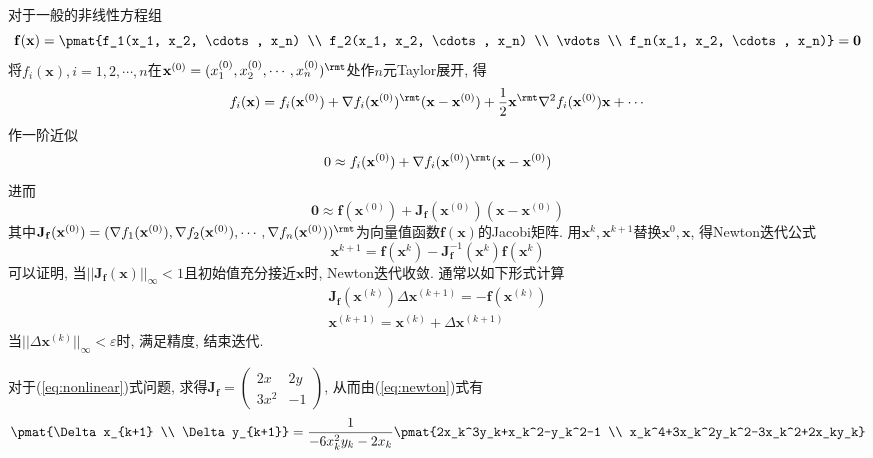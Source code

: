 \documentclass{nedsart}
\begin{document}
\def\bX{\mathbf{x}}
\def\bF{\mathbf{f}}
\def\jacobi{\mathbf{J}_\bF}

对于一般的非线性方程组
\begin{equation}
    \bF(\mathbf{x}) = \pmat{f_1(x_1, x_2, \cdots, x_n) \\ f_2(x_1, x_2, \cdots, x_n) \\ \vdots \\ f_n(x_1, x_2, \cdots, x_n)} = \mathbf{0}
\end{equation}
将$f_i(\bX), i=1,2,\cdots,n$在$\bX^{(0)} = (x^{(0)}_1, x^{(0)}_2, \cdots, x^{(0)}_n)^\rmt$处作$n$元Taylor展开, 得
\begin{equation}
    f_i(\bX) = f_i(\bX^{(0)}) + \nabla f_i(\bX^{(0)})^\rmt (\bX - \bX^{(0)}) + \frac{1}{2} \bX^\rmt \nabla^2 {f_i(\bX^{(0)})} \bX + \cdots
\end{equation}
作一阶近似
\begin{equation}
    0 \approx f_i(\bX^{(0)}) + \nabla f_i(\bX^{(0)})^\rmt (\bX - \bX^{(0)})
\end{equation}
进而
\begin{equation}
    \mathbf{0} \approx \bF(\bX^{(0)}) + \jacobi (\bX^{(0)}) (\bX - \bX^{(0)})
\end{equation}
其中$\jacobi (\bX^{(0)}) = (\nabla f_1(\bX^{(0)}), \nabla f_2(\bX^{(0)}), \cdots, \nabla f_n(\bX^{(0)}))^\rmt$为向量值函数$\bF(\mathbf{x})$的Jacobi矩阵. 用$\bX^{k}, \bX^{k+1}$替换$\bX^{0}, \bX$, 得Newton迭代公式
\begin{equation}
    \bX^{k+1} = \bF(\bX^{k}) - \jacobi^{-1} (\bX^{k}) \bF(\bX^{k})
\end{equation}
可以证明, 当$||\jacobi(\bX)||_\infty < 1$且初始值充分接近$\bX$时, Newton迭代收敛. 通常以如下形式计算
\begin{equation}\label{eq:newton}
    \begin{gathered}
        \jacobi (\bX^{(k)}) \Delta \bX^{(k+1)} = - \bF(\bX^{(k)}) \\
        \bX^{(k+1)} = \bX^{(k)} + \Delta \bX^{(k+1)} 
    \end{gathered}
\end{equation}
当$||\Delta \bX^{(k)}||_\infty < \varepsilon$时, 满足精度, 结束迭代.

对于(\ref{eq:nonlinear})式问题, 求得$\jacobi = \begin{pmatrix}
    2x & 2y \\
    3x^2 & -1
\end{pmatrix}$, 从而由(\ref{eq:newton})式有
\begin{equation}\label{eq:newtonsln}
    \pmat{\Delta x_{k+1} \\ \Delta y_{k+1}} = \frac{1}{-6x_k^2y_k-2x_k} \pmat{2x_k^3y_k+x_k^2-y_k^2-1 \\ x_k^4+3x_k^2y_k^2-3x_k^2+2x_ky_k} 
\end{equation}
\end{document}
